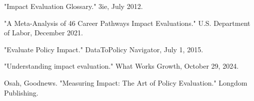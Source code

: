 \documentclass[main.tex]{subfiles}
\begin{document}
\begin{thebibliography}{21}
 "Impact Evaluation Glossary." 3ie, July 2012.

 "A Meta-Analysis of 46 Career Pathways Impact Evaluations." U.S. Department of Labor, December 2021.

 "Evaluate Policy Impact." DataToPolicy Navigator, July 1, 2015.

 "Understanding impact evaluation." What Works Growth, October 29, 2024.

 Osah, Goodnews. "Measuring Impact: The Art of Policy Evaluation." Longdom Publishing.

\end{thebibliography}
\end{document}

